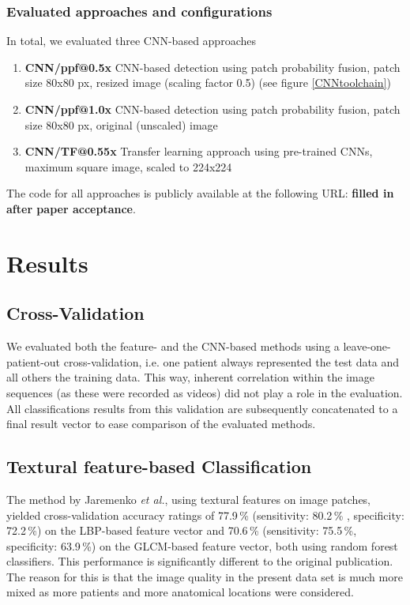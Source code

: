 \documentclass[fleqn,10pt]{wlscirep}
\begin{document}
\subsubsection*{Evaluated approaches and configurations}

In total, we evaluated three CNN-based approaches
\begin{enumerate}
\item \textbf{CNN/ppf@0.5x} CNN-based detection using patch
  probability fusion, patch size 80x80 px, resized image (scaling factor 0.5) (see figure
  \ref{CNNtoolchain})
\item \textbf{CNN/ppf@1.0x} CNN-based detection using patch
  probability fusion, patch size 80x80 px, original
  (unscaled) image
\item \textbf{CNN/TF@0.55x} Transfer learning approach using pre-trained CNNs, maximum square image, scaled to 224x224
\end{enumerate}


The code for all approaches is publicly available at the following URL: \textbf{filled in after paper acceptance}.


 
\section{Results}


\subsection{Cross-Validation}

We evaluated both the feature- and the CNN-based methods using a leave-one-patient-out
cross-validation, i.e. one patient always represented the
test data and all others the training data. This way, inherent
correlation within the image sequences (as these were recorded as
videos) did not play a role in the evaluation. All classifications
results from this validation are subsequently concatenated to a final
result vector to ease comparison of the evaluated methods. 

\subsection{Textural feature-based Classification}

The method by Jaremenko \textit{et al.}\cite{Jaremenko:2015kh}, using textural
features on image patches,
yielded cross-validation accuracy ratings of  77.9\,\% (sensitivity: 80.2\,\% , specificity: 72.2\,\%) on the LBP-based feature vector and 
70.6\,\% (sensitivity: 75.5\,\%, specificity: 63.9\,\%) on the GLCM-based feature
vector, both using random forest classifiers. This performance is
significantly different to the original publication. The reason for
this is that the image quality in the present data set is much more
mixed as more patients and more anatomical locations were considered.
\end{document}
